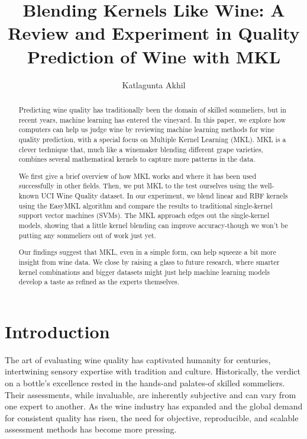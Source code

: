 \documentclass[11pt]{article}
\title{Blending Kernels Like Wine: A Review and Experiment in Quality Prediction of Wine with MKL}
\author[]{Katlagunta Akhil}
\affil[]{School of Computing \\MIT Art, Design and Technology University \\Pune, India \\akhil.katlagunta.111@gmail.com}
\date{}
\begin{document}
\maketitle

\begin{abstract}

  Predicting wine quality has traditionally been the domain of skilled sommeliers, but in recent years, machine learning has entered the vineyard. In this paper, we explore how computers can help us judge wine by reviewing machine learning methods for wine quality prediction, with a special focus on Multiple Kernel Learning (MKL). MKL is a clever technique that, much like a winemaker blending different grape varieties, combines several mathematical kernels to capture more patterns in the data.

We first give a brief overview of how MKL works and where it has been used successfully in other fields. Then, we put MKL to the test ourselves using the well-known UCI Wine Quality dataset. In our experiment, we blend linear and RBF kernels using the EasyMKL algorithm and compare the results to traditional single-kernel support vector machines (SVMs). The MKL approach edges out the single-kernel models, showing that a little kernel blending can improve accuracy-though we won’t be putting any sommeliers out of work just yet.

Our findings suggest that MKL, even in a simple form, can help squeeze a bit more insight from wine data. We close by raising a glass to future research, where smarter kernel combinations and bigger datasets might just help machine learning models develop a taste as refined as the experts themselves.
  
\end{abstract}

\section{Introduction}

  The art of evaluating wine quality has captivated humanity for centuries, intertwining sensory expertise with tradition and culture. Historically, the verdict on a bottle’s excellence rested in the hands-and palates-of skilled sommeliers. Their assessments, while invaluable, are inherently subjective and can vary from one expert to another. As the wine industry has expanded and the global demand for consistent quality has risen, the need for objective, reproducible, and scalable assessment methods has become more pressing.
\end{document}
